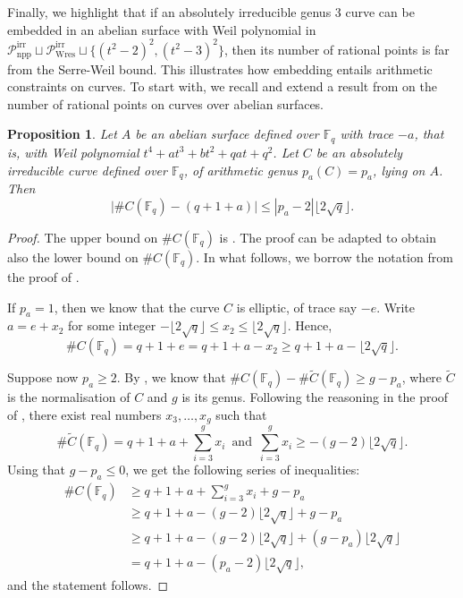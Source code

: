 \documentclass[11pt]{amsart}
\newcommand\Fq{\mathbb{F}_q}
\theoremstyle{plain}
\newtheorem{proposition}[theorem]{Proposition}
\theoremstyle{definition}
\newcommand\PirrA{\mathcal{P}^\mathrm{irr}_\mathrm{npp}}
\newcommand\PirrB{\mathcal{P}^\mathrm{irr}_\mathrm{Wres}}
\begin{document}
Finally, we highlight that if an absolutely irreducible genus $3$ curve can be embedded in an abelian surface with Weil polynomial in $\PirrA\sqcup\PirrB\sqcup  \{ (t^2-2)^2 , (t^2-3)^2 \}$, then its number of rational points is far from the Serre-Weil bound.  This illustrates how embedding entails arithmetic constraints on curves. %
To start with, we recall and extend a result from \cite{Haloui17} on the number of rational points on curves over abelian surfaces.
\begin{proposition}\label{prop:rationalpoints}
    Let $A$ be an abelian surface defined over $\Fq$ with trace $-a$, that is, with Weil polynomial $t^4+at^3+bt^2+qat+q^2$. Let $C$ be an absolutely irreducible curve defined over $\Fq$, of arithmetic genus $p_a(C)=p_a$, lying on $A$. Then
    \[ \vert\#C(\Fq)  - (q + 1+a) \vert \leq |p_a-2|\lfloor 2\sqrt{q}\rfloor.\]
\end{proposition}
\begin{proof}
    The upper bound on $\#C(\Fq)$ is \cite[Thm.~4]{Haloui17}. 
    The proof can be adapted to obtain also the lower bound on $\#C(\Fq)$. In what follows, we borrow the notation from the proof of \cite[Thm.~4]{Haloui17}.

    If $p_a=1$, then we know that the curve $C$ is elliptic, of trace say $-e$. Write $a=e+x_2$ for some integer $-\lfloor 2\sqrt{q}\rfloor\leq x_2 \leq \lfloor 2\sqrt{q}\rfloor$. Hence,
    \[ \#C(\Fq) = q+1 +e = q+1+a-x_2 \geq q+1+a - \lfloor 2\sqrt{q}\rfloor. \]

    Suppose now $p_a\geq 2$. 
    By \cite[Prop.~2.3]{AP96}, we know that $\#C(\Fq)-\# \tilde C(\Fq) \geq g-p_a$, where $\tilde C$ is the normalisation of $C$ and $g$ is its genus. Following the reasoning in the proof of  \cite[Thm.~4, Eq.~(5)]{Haloui17}, there exist real numbers $x_3,\dots,x_g$ such that
    $$\# \tilde C(\Fq)=q+1+a+\sum_{i=3}^g x_i\,\text{ and }\,\sum_{i=3}^g x_i \geq -(g-2)\lfloor 2\sqrt{q}\rfloor.$$ Using that  $g-p_a\leq 0$, we get the following series of inequalities:
    \begin{align*}
    \#C(\Fq)& \geq q+1+a+\sum_{i=3}^g x_i+g-p_a\\
    & \geq q+1+a - (g-2)\lfloor 2\sqrt{q}\rfloor +g -p_a\\
    & \geq q+1+a - (g-2)\lfloor 2\sqrt{q}\rfloor +(g - p_a)\lfloor 2\sqrt{q}\rfloor\\
    &= q+1+a - (p_a-2)\lfloor 2\sqrt{q}\rfloor,
    \end{align*}
    and the statement follows.
\end{proof}
\end{document}
